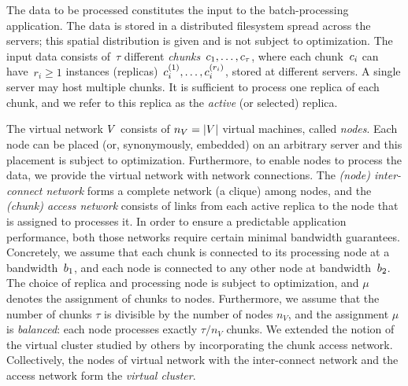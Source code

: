  The data to be processed constitutes the input to the batch-processing application.
The data is stored in a distributed filesystem spread across the servers; this spatial distribution is given and is not subject to optimization.
The input data consists of~$\tau$ different \emph{chunks}~$c_1, \ldots, c_{\tau}$,
where each chunk~$c_i$ can have~$r_i\geq 1$ instances (replicas)~$c_{i}^{(1)},\ldots, c_{i}^{(r_i)}$,
 stored at different servers. A single server may host multiple chunks.
It is sufficient to process one replica of each chunk, and we refer to this
replica as the \emph{active} (or selected) replica.

 The virtual network $V$ consists of $n_V=|V|$ virtual machines, called \emph{nodes}.
Each node can be placed (or, synonymously, embedded) on an arbitrary server and this placement is subject
to optimization.
Furthermore, to enable nodes to process the data, we provide the virtual network with network connections.
The \emph{(node) inter-connect network} forms a complete network (a clique) among nodes,
and the \emph{(chunk) access network} consists of links from each active replica to the node that is assigned to processes it.
In order to ensure a predictable application performance, both those networks require certain minimal bandwidth guarantees.
Concretely, we assume that each chunk
is connected to its processing node at a bandwidth~$b_1$, and each node is connected to any other node
at  bandwidth~$b_2$.
The choice of replica and processing node is subject to optimization, and
$\mu$ denotes the assignment of chunks to nodes.
Furthermore, we assume that the number of chunks $\tau$ is divisible by the number of nodes $n_V$, and the assignment $\mu$ is \emph{balanced}:
each node processes exactly $\tau / n_V$ chunks.
We extended the notion of the virtual cluster studied by others \cite{oktopus,talk-about,infocom16,ccr15emb,proteus} by incorporating the chunk access network.
Collectively, the nodes of virtual network with the inter-connect network and the access network form the \emph{virtual cluster}.

